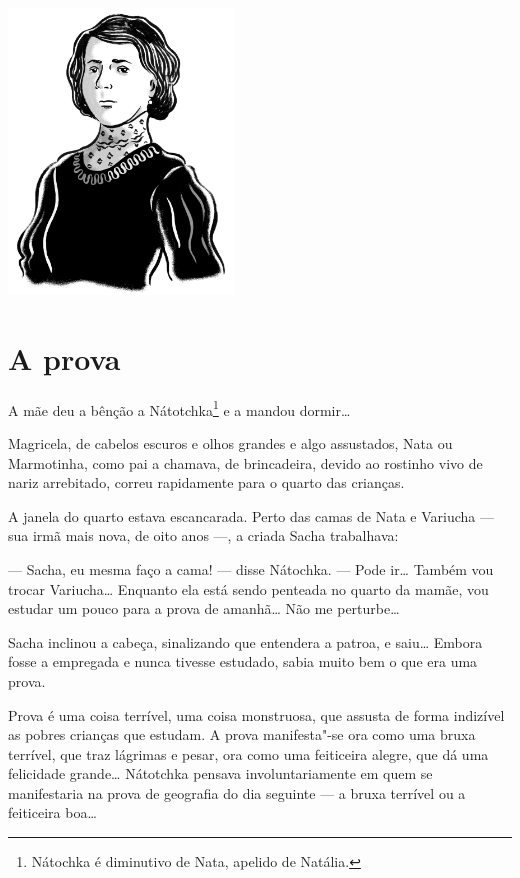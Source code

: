 \pagebreak
\thispagestyle{empty}
\mbox{}
\vfill
\begin{center}
\includegraphics[width=6cm]{./imgs/autor10.jpg}
\end{center}


\chapter{A prova} \label{part12}

A mãe deu a bênção a Nátotchka\footnote{Nátochka é diminutivo de
  Nata, apelido de Natália.} e a mandou dormir\ldots{}

Magricela, de cabelos escuros e olhos grandes e algo assustados, Nata ou
Marmotinha, como pai a chamava, de brincadeira, devido ao rostinho
vivo de nariz arrebitado, correu rapidamente para o quarto das crianças.

A janela do quarto estava escancarada. Perto das camas de Nata e
Variucha --- sua irmã mais nova, de oito anos ---, a criada Sacha
trabalhava:

--- Sacha, eu mesma faço a cama! --- disse Nátochka. --- Pode ir\ldots{}
Também vou trocar Variucha\ldots{} Enquanto ela está sendo penteada no quarto
da mamãe, vou estudar um pouco para a prova de amanhã\ldots{} Não me
perturbe\ldots{}

Sacha inclinou a cabeça, sinalizando que entendera a patroa, e saiu\ldots{}
Embora fosse a empregada e nunca tivesse estudado, sabia muito bem o que
era uma prova.

Prova é uma coisa terrível, uma coisa monstruosa, que assusta de forma
indizível as pobres crianças que estudam. A prova manifesta"-se ora como
uma bruxa terrível, que traz lágrimas e pesar, ora como uma feiticeira
alegre, que dá uma felicidade grande\ldots{} Nátotchka pensava
involuntariamente em quem se manifestaria na prova de geografia do dia
seguinte --- a bruxa terrível ou a feiticeira boa\ldots{}

